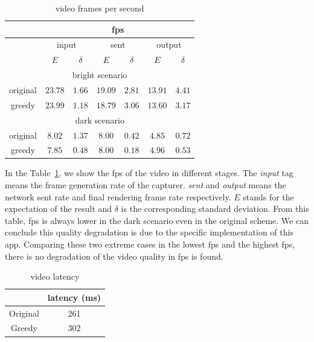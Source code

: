 \begin{table}[h]
  \centering
  \caption{video frames per second}
  \label{tab:fps}
  \begin{tabular}{|c|c|c|c|c|c|c|} %
    \hline
    & \multicolumn{6}{|c|}{fps} \\ \hline
    & \multicolumn{2}{|c|}{input} & \multicolumn{2}{|c|}{sent}
    & \multicolumn{2}{|c|}{output}
    \\ \hline
    & $E$ & $\delta$ & $E$ & $\delta$ & $E$ & $\delta$ \\ \hline
    \multicolumn{7}{|c|}{bright scenario} \\ \hline
    original & $23.78$ & $1.66$ & $19.09$ & $2.81$ & $13.91$ & $4.41$ 
    \\ \hline
    greedy & $23.99$ & $1.18$ & $18.79$ & $3.06$ & $13.60$ & $3.17$
    \\ \hline
    \multicolumn{7}{|c|}{dark scenario} \\ \hline
    original & $8.02$ & $1.37$ & $8.00$ & $0.42$ & $4.85$ & $0.72$ \\ \hline
    greedy & $7.85$ & $0.48$ & $8.00$ & $0.18$ & $4.96$ & $0.53$ \\ \hline
  \end{tabular}
  
\end{table}


In the Table~\ref{tab:fps}, we show the fps of the video in different
stages. The {\it input} tag means the frame generation rate of the
capturer. {\it sent} and {\it output} means the network sent rate and
final rendering frame rate respectively. $E$ stands for the
expectation of the result and $\delta$ is the corresponding standard
deviation. From this table, fps is always lower in the dark scenario
even in the original scheme. We can conclude this quality degradation
is due to the specific implementation of this app. Comparing these two
extreme cases in the lowest fps and the highest fps, there is no
degradation of the video quality in fps is found. 

\begin{table}[h]
  \centering
  \caption{video latency}
  \label{tab:latency}
  \begin{tabular}{|c|c|}
    \hline
    & latency (ms) \\ \hline
    Original & 261 \\ \hline
    Greedy & 302 \\ \hline
  \end{tabular}
\end{table}


